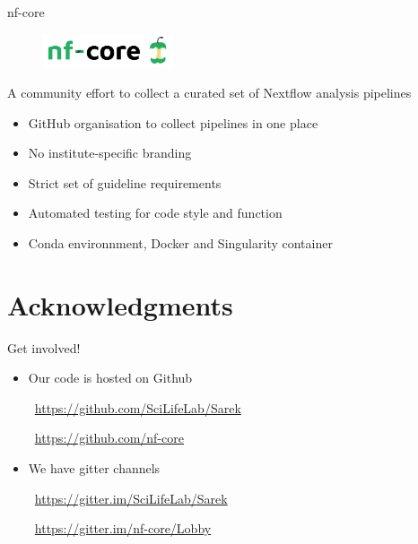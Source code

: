 \documentclass[usepdftitle=false]{beamer}
\begin{document}
\begin{frame}{nf-core}
	\begin{figure}
		\includegraphics[height=1cm]{pictures/nf-core-logo}
	\end{figure}
	A community effort to collect a curated set of Nextflow analysis pipelines
	\begin{itemize}
		\item GitHub organisation to collect pipelines in one place
		\item No institute-specific branding
		\item Strict set of guideline requirements
		\item Automated testing for code style and function
		\item Conda environnment, Docker and Singularity container
	\end{itemize}
\end{frame}


\section{Acknowledgments}

\begin{frame}{Get involved!}
	\begin{itemize}
		\item Our code is hosted on Github

		\faGithub\ \url{https://github.com/SciLifeLab/Sarek}

		\faGithub\ \url{https://github.com/nf-core}
	\end{itemize}
	\pause
	\begin{itemize}
		\item We have gitter channels

		\faGroup\ \url{https://gitter.im/SciLifeLab/Sarek}

		\faGroup\ \url{https://gitter.im/nf-core/Lobby}
	\end{itemize}
\end{frame}

\end{document}
